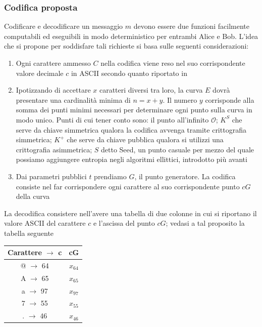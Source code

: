 \documentclass[a4paper,12pt]{tesiinfo}
\begin{document}
\subsubsection{Codifica proposta}
Codificare e decodificare un messaggio $m$ devono essere due funzioni facilmente computabili ed eseguibili in modo deterministico per entrambi Alice e Bob. L'idea che si propone per soddisfare tali richieste si basa sulle seguenti considerazioni:
\begin{enumerate}
 \item Ogni carattere ammesso $C$ nella codifica viene reso nel suo corrispondente valore decimale $c$ in ASCII secondo quanto riportato in \cite{ascii}
 \item Ipotizzando di accettare $x$ caratteri diversi tra loro, la curva $E$ dovr\`a presentare una cardinalit\`a minima di $n = x + y$. Il numero $y$ corrisponde alla somma dei punti minimi necessari per determinare ogni punto sulla curva in modo unico. Punti di cui tener conto sono: il punto all'infinito $\mathcal{O}$; $K^S$ che serve da chiave simmetrica qualora la codifica avvenga tramite crittografia simmetrica; $K^+$ che serve da chiave pubblica qualora si utilizzi una crittografia asimmetrica; $S$ detto Seed, un punto casuale per mezzo del quale possiamo aggiungere entropia negli algoritmi ellittici, introdotto pi\`u avanti
 \item Dai parametri pubblici $t$ prendiamo $G$, il punto generatore. La codifica consiste nel far corrispondere ogni carattere al suo corrispondente punto $cG$ della curva
 \label{Pcodifica}
\end{enumerate}
La decodifica consistere nell'avere una tabella di due colonne in cui si riportano il valore ASCII del carattere $c$ e l'ascissa del punto $cG$; vedasi a tal proposito la tabella seguente
\begin{center}
\begin{tabular}{ c c }
 Carattere $\to$ c & cG\\
 \hline
 @ $\to$ 64 & $x_{64}$\\
 A $\to$ 65 & $x_{65}$\\
 a $\to$ 97 & $x_{97}$\\
 7 $\to$ 55 & $x_{55}$\\
 . $\to$ 46 & $x_{46}$
 \label{decodifica1}
\end{tabular}
\end{center}
\end{document}
